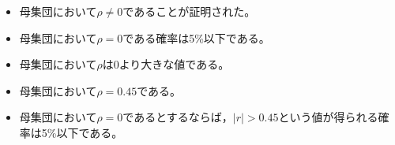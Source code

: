 \begin{itemize}
	\item 母集団において$\rho\neq 0$であることが証明された。
	\item 母集団において$\rho=0$である確率は5\%以下である。
	\item 母集団において$\rho$は0より大きな値である。
	\item 母集団において$\rho=0.45$である。
	\item 母集団において$\rho=0$であるとするならば，$|r|>0.45$という値が得られる確率は5\%以下である。
\end{itemize}
